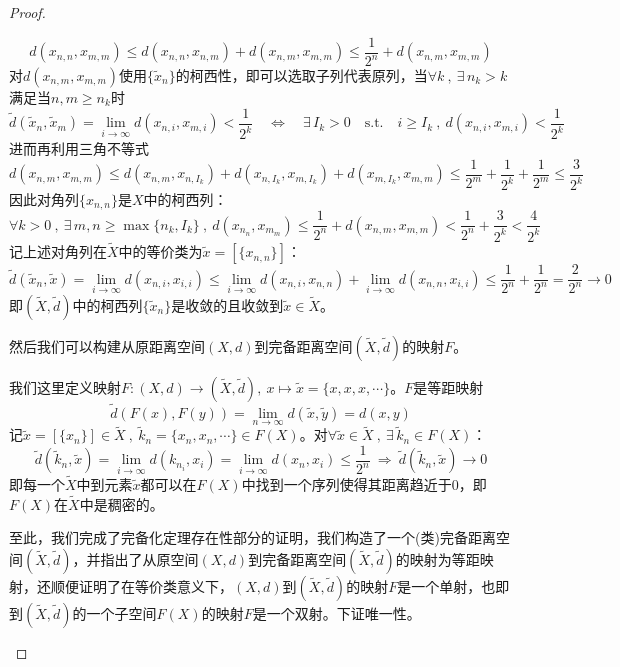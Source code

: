 \begin{proof}
\begin{proposition}
\[d(x_{n,n},x_{m,m}) \leq d(x_{n,n},x_{n,m})+d(x_{n,m},x_{m,m}) \leq \frac{1}{2^n}+d(x_{n,m},x_{m,m})\]
对$d(x_{n,m},x_{m,m})$使用$\{\tilde{x}_n\}$的柯西性，即可以选取子列代表原列，当$\forall k \ , \ \exists \, n_k>k$满足当$n,m \geq n_k$时
\[\tilde{d}(\tilde{x}_n,\tilde{x}_m)=\lim_{i \to \infty}d(x_{n,i},x_{m,i})<\frac{1}{2^k} \quad \Leftrightarrow \quad \exists \, I_k>0 \quad \text{s.t.} \quad i \geq I_k \ , \ d(x_{n,i},x_{m,i})<\frac{1}{2^k}\]
进而再利用三角不等式
\[d(x_{n,m},x_{m,m}) \leq d(x_{n,m},x_{n,{I_k}})+d(x_{n,{I_k}},x_{m,{I_k}})+d(x_{m,{I_k}},x_{m,m}) \leq \frac{1}{2^m}+\frac{1}{2^k}+\frac{1}{2^m} \leq \frac{3}{2^k}\]
因此对角列$\{x_{n,n}\}$是$X$中的柯西列：
\[\forall k>0 \ , \ \exists \, m,n \geq \max\{n_k,I_k\} \ , \ d(x_{n_n},x_{m_m}) \leq \frac{1}{2^n}+d(x_{n,m},x_{m,m}) < \frac{1}{2^n}+\frac{3}{2^k} < \frac{4}{2^k}\]
记上述对角列在$\tilde{X}$中的等价类为$\tilde{x}=[\{x_{n,n}\}]$：
\[\tilde{d}(\tilde{x}_n,\tilde{x})=\lim_{i \to \infty}d(x_{n,i},x_{i,i}) \leq \lim_{i \to \infty}d(x_{n,i},x_{n,n})+\lim_{i \to \infty}d(x_{n,n},x_{i,i}) \leq \frac{1}{2^n}+\frac{1}{2^n}=\frac{2}{2^n}\to 0\]
即$(\tilde{X},\tilde{d})$中的柯西列$\{\tilde{x}_n\}$是收敛的且收敛到$\tilde{x}\in\tilde{X}$。
\end{proposition}
然后我们可以构建从原距离空间$(X,d)$到完备距离空间$(\tilde{X},\tilde{d})$的映射$F$。
\begin{proposition}
我们这里定义映射$F:(X,d) \to (\tilde{X},\tilde{d}), \ x \mapsto \tilde{x}=\{x,x,x,\cdots\}$。$F$是等距映射
\[\tilde{d}(F(x),F(y))=\lim_{n \to \infty}d(\tilde{x},\tilde{y})=d(x,y)\]
记$\tilde{x}=[\{x_n\}] \in \tilde{X} \ , \ \tilde{k}_n=\{x_n,x_n,\cdots\} \in F(X)$。对$\forall \tilde{x} \in \tilde{X} \ , \ \exists \, \tilde{k}_n \in F(X)$：
\[\tilde{d}(\tilde{k}_n,\tilde{x})=\lim_{i \to \infty}d(k_{n_i},x_i)=\lim_{i \to \infty}d(x_n,x_i) \leq \frac{1}{2^n} \ \Rightarrow \ \tilde{d}(\tilde{k}_n,\tilde{x}) \to 0\]
即每一个$\tilde{X}$中到元素$\tilde{x}$都可以在$F(X)$中找到一个序列使得其距离趋近于0，即$F(X)$在$\tilde{X}$中是稠密的。
\end{proposition}
至此，我们完成了完备化定理存在性部分的证明，我们构造了一个(类)完备距离空间$(\tilde{X},\tilde{d})$，并指出了从原空间$(X,d)$到完备距离空间$(\tilde{X},\tilde{d})$的映射为等距映射，还顺便证明了在等价类意义下，$(X,d)$到$(\tilde{X},\tilde{d})$的映射$F$是一个单射，也即到$(\tilde{X},\tilde{d})$的一个子空间$F(X)$的映射$F$是一个双射。下证唯一性。
\begin{proposition}[完备化在等距意义下的唯一性]

\end{proposition}
\end{proof}
